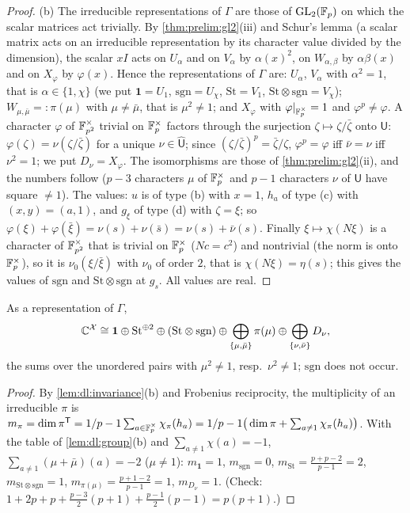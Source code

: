 \begin{proof}
(b) The irreducible representations of $\Gamma$ are those of
$\mathrm{GL}_2(\mathbb F_p)$ on which the scalar matrices act trivially. By
\cref{thm:prelim:gl2}(iii) and Schur's lemma (a scalar matrix acts on an
irreducible representation by its character value divided by the dimension),
the scalar $xI$ acts on $U_\alpha$ and on $V_\alpha$ by $\alpha(x)^2$, on
$W_{\alpha,\beta}$ by $\alpha\beta(x)$ and on $X_\varphi$ by $\varphi(x)$.
Hence the representations of $\Gamma$ are: $U_\alpha$, $V_\alpha$ with
$\alpha^2=1$, that is $\alpha\in\{1,\chi\}$ (we put $\mathbf 1=U_1$,
$\mathrm{sgn}=U_\chi$, $\mathrm{St}=V_1$, $\mathrm{St}\otimes\mathrm{sgn}=V_\chi$);
$W_{\mu,\bar\mu}=:\pi(\mu)$ with $\mu\ne\bar\mu$, that is $\mu^2\ne1$; and
$X_\varphi$ with $\varphi|_{\mathbb F_p^\times}=1$ and $\varphi^p\ne\varphi$. A
character $\varphi$ of $\mathbb F_{p^2}^\times$ trivial on $\mathbb F_p^\times$ factors through
the surjection $\zeta\mapsto\zeta/\bar\zeta$ onto $\mathsf U$:
$\varphi(\zeta)=\nu(\zeta/\bar\zeta)$ for a unique $\nu\in\widehat{\mathsf U}$;
since $(\zeta/\bar\zeta)^p=\bar\zeta/\zeta$, $\varphi^p=\varphi$ iff
$\bar\nu=\nu$ iff $\nu^2=1$; we put $D_\nu=X_\varphi$. The isomorphisms are
those of \cref{thm:prelim:gl2}(ii), and the numbers follow ($p-3$ characters
$\mu$ of $\mathbb F_p^\times$ and $p-1$ characters $\nu$ of $\mathsf U$ have square
$\ne1$). The values: $u$ is of type (b) with $x=1$, $h_a$ of type (c) with
$(x,y)=(a,1)$, and $g_\xi$ of type (d) with $\zeta=\xi$; so
$\varphi(\xi)+\varphi(\bar\xi)=\nu(s)+\nu(\bar s)=\nu(s)+\bar\nu(s)$. Finally
$\xi\mapsto\chi(N\xi)$ is a character of $\mathbb F_{p^2}^\times$ that is trivial on
$\mathbb F_p^\times$ ($Nc=c^2$) and nontrivial (the norm is onto $\mathbb F_p^\times$), so it is
$\nu_0(\xi/\bar\xi)$ with $\nu_0$ of order $2$, that is $\chi(N\xi)=\eta(s)$;
this gives the values of $\mathrm{sgn}$ and $\mathrm{St}\otimes\mathrm{sgn}$ at
$g_s$. All values are real.
\end{proof}

\begin{lemma}[Decomposition]\label{lem:dl:decomp}
As a representation of $\Gamma$,
\[
  \mathbb C^{\mathcal X}\cong\mathbf 1\oplus\mathrm{St}^{\oplus2}
  \oplus(\mathrm{St}\otimes\mathrm{sgn})
  \oplus\bigoplus_{\{\mu,\bar\mu\}}\pi(\mu)\oplus\bigoplus_{\{\nu,\bar\nu\}}D_\nu,
\]
the sums over the unordered pairs with $\mu^2\ne1$, resp.\ $\nu^2\ne1$;
$\mathrm{sgn}$ does not occur.
\end{lemma}

\begin{proof}
By \cref{lem:dl:invariance}(b) and Frobenius reciprocity, the multiplicity of
an irreducible $\pi$ is
$m_\pi=\dim\pi^{\mathsf T}=1/p-1\sum_{a\in\mathbb F_p^\times}\chi_\pi(h_a)
=1/p-1\big(\dim\pi+\sum_{a\ne1}\chi_\pi(h_a)\big)$. With the table of
\cref{lem:dl:group}(b) and $\sum_{a\ne1}\chi(a)=-1$,
$\sum_{a\ne1}(\mu+\bar\mu)(a)=-2$ ($\mu\ne1$): $m_{\mathbf 1}=1$,
$m_{\mathrm{sgn}}=0$, $m_{\mathrm{St}}=\frac{p+p-2}{p-1}=2$,
$m_{\mathrm{St}\otimes\mathrm{sgn}}=1$, $m_{\pi(\mu)}=\frac{p+1-2}{p-1}=1$,
$m_{D_\nu}=1$. (Check:
$1+2p+p+\frac{p-3}2(p+1)+\frac{p-1}2(p-1)=p(p+1)$.)
\end{proof}

